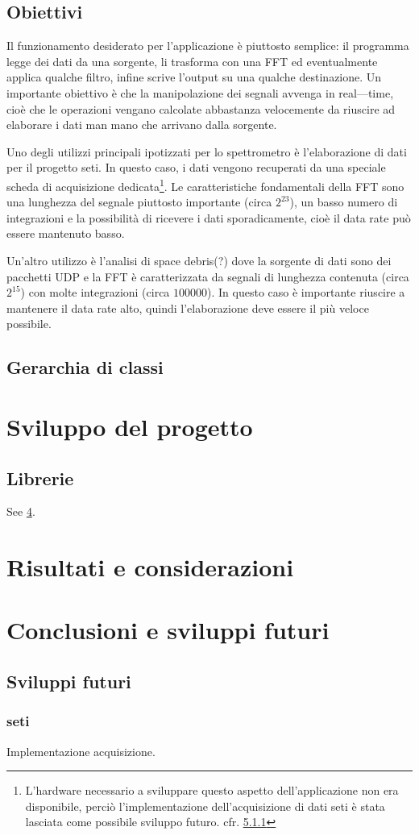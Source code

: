 \documentclass[a4paper,11pt,twoside,openright]{unibo}
\begin{document}
\section{Obiettivi}
Il funzionamento desiderato per l'applicazione \`e piuttosto semplice: il
programma legge dei dati da una sorgente, li trasforma con una FFT ed
eventualmente applica qualche filtro, infine scrive l'output su una qualche
destinazione. Un importante obiettivo \`e che la manipolazione dei segnali
avvenga in real---time, cio\`e che le operazioni vengano calcolate abbastanza
velocemente da riuscire ad elaborare i dati man mano che arrivano dalla
sorgente.

Uno degli utilizzi principali ipotizzati per lo spettrometro \`e l'elaborazione
di dati per il progetto \ac{seti}. In questo caso, i dati vengono recuperati da
una speciale scheda di acquisizione dedicata\footnote{L'hardware necessario a
sviluppare questo aspetto dell'applicazione non era disponibile, perci\`o
    l'implementazione dell'acquisizione di dati \ac{seti} \`e stata lasciata
    come possibile sviluppo futuro. cfr. \ref{seti}}.
Le caratteristiche fondamentali della FFT sono una lunghezza del segnale
piuttosto importante (circa $2^{23}$), un basso numero di integrazioni e la
possibilit\`a di ricevere i dati sporadicamente, cio\`e il data rate pu\`o
essere mantenuto basso.

Un'altro utilizzo \`e l'analisi di space debris(?) dove la sorgente di dati sono
dei pacchetti UDP e la FFT \`e caratterizzata da segnali di lunghezza contenuta
(circa $2^{15}$) con molte integrazioni (circa $100000$). In questo caso \`e
importante riuscire a mantenere il data rate alto, quindi l'elaborazione deve
essere il pi\`u veloce possibile.

\section{Gerarchia di classi}
\chapter{Sviluppo del progetto}
\label{sw_devel}
\section{Librerie}
See \ref{tests}.
\chapter{Risultati e considerazioni}
\label{tests}
\chapter{Conclusioni e sviluppi futuri}
\label{conclusions}
\section{Sviluppi futuri}
\subsection{\ac{seti}}
\label{seti}
Implementazione acquisizione.


\end{document}
